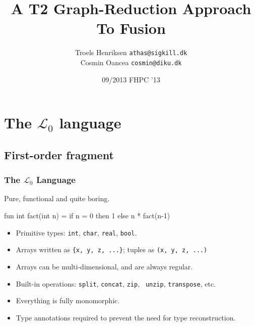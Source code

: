 \documentclass{beamer}
\title{A T2 Graph-Reduction Approach To Fusion}
\author[T.Henriksen,C.Oancea]{Troels Henriksen {\tt athas@sigkill.dk}\\Cosmin Oancea {\tt cosmin@diku.dk}}
\institute{Department of Computer Science (DIKU)\\University of Copenhagen}
\date[09/23]{09/2013 \textsc{FHPC} '13}
\newcommand{\LO}{$\mathcal{L}_0$}
\begin{document}
\titleslide

\begin{frame}[fragile]
  \tableofcontents
\end{frame}



\section{The \LO{} language}

\subsection{First-order fragment}

\begin{frame}[fragile,t]
  \frametitle{The \LO{} Language}

  Pure, functional and quite boring.

  \begin{colorcode}
    fun int fact(int n) =
    if n = 0 then 1 else n * fact(n-1)
  \end{colorcode}

  \pause

  \begin{itemize}
  \item Primitive types: {\tt int}, {\tt char}, {\tt real}, {\tt bool}.
  \item Arrays written as {\tt \{x, y, z, ...\}}; tuples as {\tt (x, y,
      z, ...)}
  \item Arrays can be multi-dimensional, and are always regular.
  \item Built-in operations: {\tt split}, {\tt concat}, {\tt zip}, {\tt
      unzip}, {\tt transpose}, etc.
  \item Everything is fully monomorphic.
  \item Type annotations required to prevent the need for type
    reconstruction.
  \end{itemize}
\end{frame}
\end{document}

